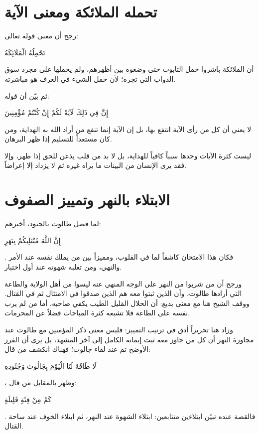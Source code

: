\section{تحمله الملائكة ومعنى الآية}
رجح  أن معنى قوله تعالى: \begin{ayah}تَحْمِلُهُ الْمَلَائِكَةُ\end{ayah} أن الملائكة باشروا حمل التابوت حتى وضعوه بين أظهرهم، ولم يحملها على مجرد سوق الدواب التي تجره؛ لأن حمل الشيء في العرف هو مباشرته.

ثم بيّن أن قوله: \begin{ayah}إِنَّ فِي ذَلِكَ لَآيَةً لَكُمْ إِنْ كُنْتُمْ مُؤْمِنِينَ\end{ayah} لا يعني أن كل من رأى الآية انتفع بها، بل إن الآية إنما تنفع من أراد الله به الهداية، ومن كان مستعداً للتسليم إذا ظهر البرهان.

\begin{fawaid}
ليست كثرة الآيات وحدها سبباً كافياً للهداية، بل لا بد من قلب يذعن للحق إذا ظهر، وإلا فقد يرى الإنسان من البينات ما يراه غيره ثم لا يزداد إلا إعراضاً.
\end{fawaid}

\separator

\section{الابتلاء بالنهر وتمييز الصفوف}
لما فصل طالوت بالجنود، أخبرهم: \begin{ayah}إِنَّ اللَّهَ مُبْتَلِيكُمْ بِنَهَرٍ\end{ayah}. فكان هذا الامتحان كاشفاً لما في القلوب، ومميزاً بين من يملك نفسه عند الأمر والنهي، ومن تغلبه شهوته عند أول اختبار.

ورجح  أن من شربوا من النهر على الوجه المنهي عنه ليسوا من أهل الولاية والطاعة التي أرادها طالوت، وأن الذين ثبتوا معه هم الذين صدقوا في الامتثال ثم في القتال. ووقف الشيخ هنا مع معنى بديع: أن الحلال القليل الطيب يكفي صاحبه، أما من لم يرب نفسه على الطاعة فلا تشبعه كثرة المباحات فضلاً عن المحرمات.

وزاد  هنا تحريراً أدق في ترتيب التمييز: فليس معنى ذكر المؤمنين مع طالوت عند مجاوزة النهر أن كل من جاوز معه ثبت إيمانه الكامل إلى آخر المشهد، بل يرى أن الفرز الأوضح تم عند لقاء جالوت؛ فهناك انكشف من قال: \begin{ayah}لَا طَاقَةَ لَنَا الْيَوْمَ بِجَالُوتَ وَجُنُودِهِ\end{ayah}، وظهر بالمقابل من قال: \begin{ayah}كَمْ مِنْ فِئَةٍ قَلِيلَةٍ\end{ayah}. فالقصة عنده تبيّن ابتلاءين متتابعين: ابتلاء الشهوة عند النهر، ثم ابتلاء الخوف عند ساحة القتال.

